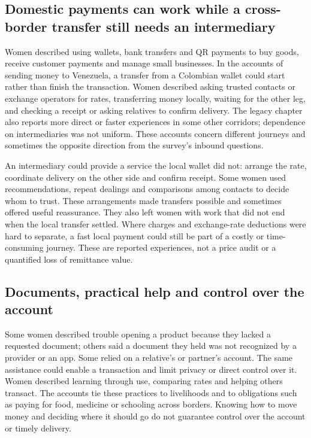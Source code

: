 \documentclass[12pt]{article}
\begin{document}
\subsection{Domestic payments can work while a cross-border transfer still needs an intermediary}

Women described using wallets, bank transfers and QR payments to buy goods, receive customer payments and manage small businesses. In the accounts of sending money to Venezuela, a transfer from a Colombian wallet could start rather than finish the transaction. Women described asking trusted contacts or exchange operators for rates, transferring money locally, waiting for the other leg, and checking a receipt or asking relatives to confirm delivery. The legacy chapter also reports more direct or faster experiences in some other corridors; dependence on intermediaries was not uniform. These accounts concern different journeys and sometimes the opposite direction from the survey's inbound questions.

An intermediary could provide a service the local wallet did not: arrange the rate, coordinate delivery on the other side and confirm receipt. Some women used recommendations, repeat dealings and comparisons among contacts to decide whom to trust. These arrangements made transfers possible and sometimes offered useful reassurance. They also left women with work that did not end when the local transfer settled. Where charges and exchange-rate deductions were hard to separate, a fast local payment could still be part of a costly or time-consuming journey. These are reported experiences, not a price audit or a quantified loss of remittance value.

\subsection{Documents, practical help and control over the account}

Some women described trouble opening a product because they lacked a requested document; others said a document they held was not recognized by a provider or an app. Some relied on a relative's or partner's account. The same assistance could enable a transaction and limit privacy or direct control over it. Women described learning through use, comparing rates and helping others transact. The accounts tie these practices to livelihoods and to obligations such as paying for food, medicine or schooling across borders. Knowing how to move money and deciding where it should go do not guarantee control over the account or timely delivery.
\end{document}
